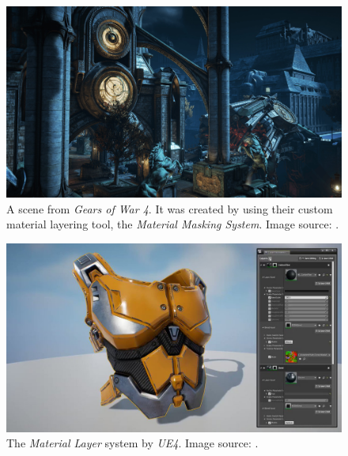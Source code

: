 \begin{figure}
	\centering
	\includegraphics[width=0.7\linewidth]{images/07cha_12_clinton-crumpler-highresscreenshot00024-min.jpg}
	\caption{\NEW
		A scene from \emph{Gears of War 4}. It was created by using their custom material layering tool, the \emph{Material Masking System}. Image source: \cite{crumpler2016Gears}. }
	\label{fig:clinton-crumpler-highresscreenshot00024-min}
\end{figure}

\begin{figure}
	\centering
	\includegraphics[width=0.7\linewidth]{images/07cha_13_TSUUuOWr5KWbCxN-.jpg}
	\caption{\NEW
		The \emph{Material Layer} system by \emph{UE4}. Image source: \cite{wilson2018ue}.}
	\label{fig:engine19}
\end{figure}



\section{\patCatMaterialContainer}\label{\patCatMaterialContainer}

